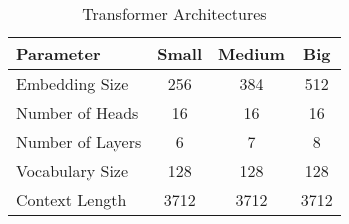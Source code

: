 \begin{table}[!htbp]
  \centering
  \begin{tabular}{l c c c}
    \toprule
    Parameter        & Small & Medium & Big  \\
    \midrule
    Embedding Size   & 256   & 384    & 512  \\
    Number of Heads  & 16    & 16     & 16   \\
    Number of Layers & 6     & 7      & 8    \\
    Vocabulary Size  & 128   & 128    & 128  \\
    Context Length   & 3712  & 3712   & 3712 \\
    \bottomrule
  \end{tabular}
  \caption{\label{tab:architecture} Transformer Architectures}
\end{table}
